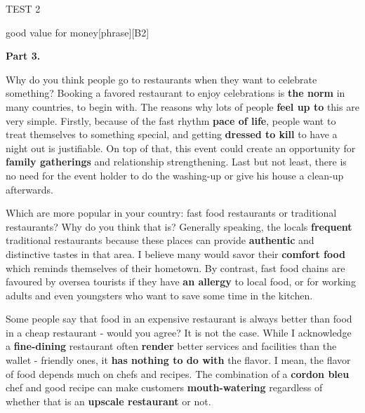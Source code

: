 \begin{glossarymc}[Cambridge 8]
\begin{test}{TEST 2}
\begin{VocabExplain}[Part 2]
            \begin{ExplainCard}{good value for money}[phrase][B2]
            \end{ExplainCard}
        \end{VocabExplain}

    \noindent
    \textbf{Part 3.}
    \begin{qa}{Why do you think people go to restaurants when they want to celebrate something?}
    Booking a favored restaurant to enjoy celebrations is \textbf{the norm} in many countries, to begin with. The reasons why lots of people \textbf{feel up to} this are very simple. Firstly, because of the fast rhythm \textbf{pace of life}, people want to treat themselves to something special, and getting \textbf{dressed to kill} to have a night out is justifiable. On top of that, this event could create an opportunity for \textbf{family gatherings} and relationship strengthening. Last but not least, there is no need for the event holder to do the washing-up or give his house a clean-up afterwards.
    \end{qa}

    \begin{qa}{Which are more popular in your country: fast food restaurants or traditional restaurants? Why do you think that is?}
    Generally speaking, the locals \textbf{frequent} traditional restaurants because these places can provide \textbf{authentic} and distinctive tastes in that area. I believe many would savor their \textbf{comfort food} which reminds themselves of their hometown. By contrast, fast food chains are favoured by oversea tourists if they have \textbf{an allergy} to local food, or for working adults and even youngsters who want to save some time in the kitchen.
    \end{qa}

    \begin{qa}{Some people say that food in an expensive restaurant is always better than food in a cheap restaurant - would you agree?}
    It is not the case. While I acknowledge a \textbf{fine-dining} restaurant often \textbf{render} better services and facilities than the wallet - friendly ones, it \textbf{has nothing to do with} the flavor. I mean, the flavor of food depends much on chefs and recipes. The combination of a \textbf{cordon bleu} chef and good recipe can make customers \textbf{mouth-watering} regardless of whether that is an \textbf{upscale restaurant} or not.
    \end{qa}


\end{test}
\end{glossarymc}
